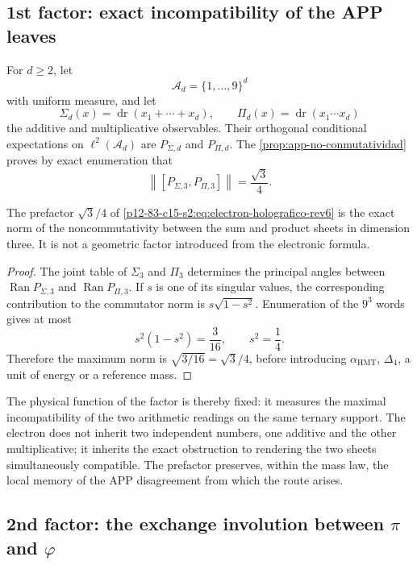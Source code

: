 \subsection{1st factor: exact incompatibility of the APP leaves}

For \(d\geq2\), let
\[
 \mathscr A_d=\{1,\ldots,9\}^d
\]
with uniform measure, and let
\[
 \Sigma_d(x)=\operatorname{dr}(x_1+\cdots+x_d),
 \qquad
 \Pi_d(x)=\operatorname{dr}(x_1\cdots x_d)
\]
the additive and multiplicative observables. Their orthogonal conditional expectations
on \(\ell^2(\mathscr A_d)\) are
\(P_{\Sigma,d}\) and \(P_{\Pi,d}\). The
\cref{prop:app-no-conmutatividad} proves by exact enumeration that
\[
 \left\|[P_{\Sigma,3},P_{\Pi,3}]\right\|
 =\frac{\sqrt3}{4}.
\]

\begin{proposition}
\label{p12-83-c15-s2:prop:prefactor-app-electron-rev6}
The prefactor \(\sqrt3/4\) of
\cref{p12-83-c15-s2:eq:electron-holografico-rev6} is the exact norm of the
noncommutativity between the sum and product sheets in dimension three.
It is not a geometric factor introduced from the electronic formula.
\end{proposition}

\begin{proof}
The joint table of \(\Sigma_3\) and \(\Pi_3\) determines the principal
angles between
\(\operatorname{Ran}P_{\Sigma,3}\) and
\(\operatorname{Ran}P_{\Pi,3}\). If \(s\) is one of its singular
values, the corresponding contribution to the commutator norm is
\(s\sqrt{1-s^2}\). Enumeration of the \(9^3\) words gives at most
\[
 s^2(1-s^2)=\frac3{16},
 \qquad s^2=\frac14.
\]
Therefore the maximum norm is \(\sqrt{3/16}=\sqrt3/4\), before
introducing \(\alpha_{\mathrm{HMT}}\), \(\Delta_4\), a unit of energy
or a reference mass.
\end{proof}

The physical function of the factor is thereby fixed: it measures the maximal incompatibility of the two arithmetic readings on the same ternary support. The electron does not inherit two independent numbers, one additive and the other multiplicative; it inherits the exact obstruction to rendering the two sheets simultaneously compatible. The prefactor preserves, within the mass law, the local memory of the APP disagreement from which the route arises.

\subsection{2nd factor: the exchange involution between \(\pi\) and \(\varphi\)}

